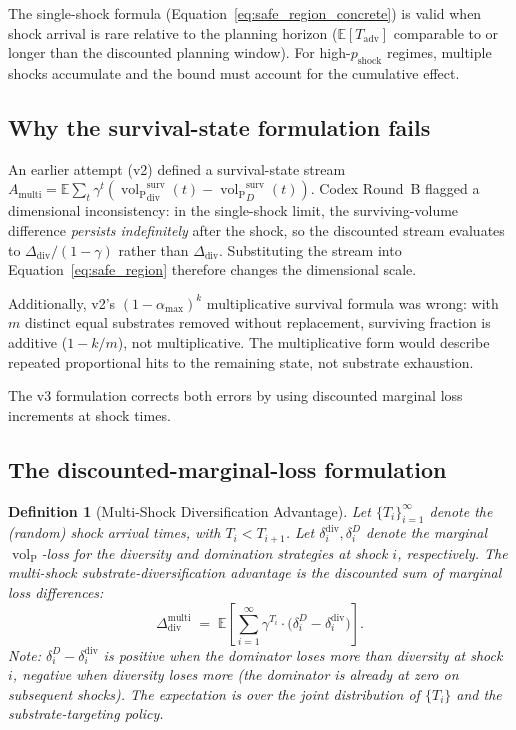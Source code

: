 \documentclass{article}
\newtheorem{definition}{Definition}
\DeclareMathOperator{\vol}{vol}
\newcommand{\volL}{{\vol_{\mathrm{P}}}}
\newcommand{\Tadv}{T_{\mathrm{adv}}}
\newcommand{\Ddiv}{\Delta_{\mathrm{div}}}
\newcommand{\pshock}{p_{\mathrm{shock}}}
\begin{document}
The single-shock formula
(Equation~\ref{eq:safe_region_concrete}) is valid when shock arrival
is rare relative to the planning horizon ($\mathbb{E}[\Tadv]$
comparable to or longer than the discounted planning window).  For
high-$\pshock$ regimes, multiple shocks accumulate and the bound must
account for the cumulative effect.

\subsection{Why the survival-state formulation fails}
\label{sec:why_survival_fails}

An earlier attempt (v2) defined a survival-state stream
$A_{\mathrm{multi}} = \mathbb{E}\sum_t \gamma^t (\volL_{\mathrm{div}}^{\mathrm{surv}}(t) - \volL_D^{\mathrm{surv}}(t))$.
Codex Round~B flagged a dimensional inconsistency: in the single-shock
limit, the surviving-volume difference \emph{persists indefinitely}
after the shock, so the discounted stream evaluates to $\Ddiv / (1 -
\gamma)$ rather than $\Ddiv$.  Substituting the stream into
Equation~\ref{eq:safe_region} therefore changes the dimensional scale.

Additionally, v2's $(1 - \alpha_{\max})^k$ multiplicative survival
formula was wrong: with $m$ distinct equal substrates removed without
replacement, surviving fraction is additive ($1 - k/m$), not
multiplicative.  The multiplicative form would describe repeated
proportional hits to the remaining state, not substrate exhaustion.

The v3 formulation corrects both errors by using discounted marginal
loss increments at shock times.

\subsection{The discounted-marginal-loss formulation}
\label{sec:multishock_marginal}

\begin{definition}[Multi-Shock Diversification Advantage]
\label{def:ddiv_multi}
Let $\{T_i\}_{i=1}^{\infty}$ denote the (random) shock arrival times,
with $T_i < T_{i+1}$.  Let $\delta_i^{\mathrm{div}}, \delta_i^D$
denote the marginal $\volL$-loss for the diversity and domination
strategies at shock $i$, respectively.  The
\emph{multi-shock substrate-diversification advantage} is the
discounted sum of marginal loss differences:
\begin{equation}
\label{eq:ddiv_multi}
\Ddiv^{\mathrm{multi}}
  \;=\; \mathbb{E}\!\left[\sum_{i=1}^{\infty}
  \gamma^{T_i} \cdot
  \bigl(\delta_i^D - \delta_i^{\mathrm{div}}\bigr)\right].
\end{equation}
Note: $\delta_i^D - \delta_i^{\mathrm{div}}$ is positive when the
dominator loses more than diversity at shock $i$, negative when
diversity loses more (the dominator is already at zero on subsequent
shocks).  The expectation is over the joint distribution of
$\{T_i\}$ and the substrate-targeting policy.
\end{definition}
\end{document}
